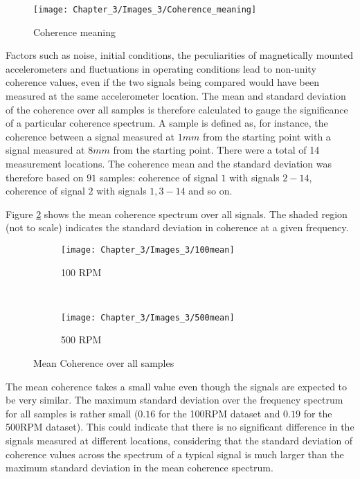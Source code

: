 \begin{figure}[H]
	\centering
	\texttt{[image: Chapter\_3/Images\_3/Coherence\_meaning]}
	\caption{Coherence meaning}
	\label{F:Coherence_meaning}
\end{figure}

Factors such as noise, initial conditions, the peculiarities of magnetically mounted accelerometers and fluctuations in operating conditions lead to non-unity coherence values, even if the two signals being compared would have been measured at the same accelerometer location. The mean and standard deviation of the coherence over all samples is therefore calculated to gauge the significance of a particular coherence spectrum. A sample is defined as, for instance, the coherence between a signal measured at $1mm$ from the starting point with a signal measured at $8mm$ from the starting point. There were a total of 14 measurement locations. The coherence mean and the standard deviation was therefore based on $91$ samples: coherence of signal $1$ with signals $2-14$, coherence of signal $2$ with signals $1, 3-14$ and so on. 

Figure \ref{F:mean} shows the mean coherence spectrum over all signals. The shaded region (not to scale) indicates the standard deviation in coherence at a given frequency.  

\begin{figure}[H]
	\centering
	\begin{subfigure}{0.49\textwidth}
		\texttt{[image: Chapter\_3/Images\_3/100mean]}
		\caption{100 RPM}
	\end{subfigure}
	~
	\begin{subfigure}{0.49\textwidth}
		\texttt{[image: Chapter\_3/Images\_3/500mean]}
		\caption{500 RPM}
	\end{subfigure}
	
	\caption{Mean Coherence over all samples}
	\label{F:mean}
\end{figure}

The mean coherence takes a small value even though the signals are expected to be very similar. The maximum standard deviation over the frequency spectrum for all samples is rather small ($0.16$ for the 100RPM dataset and $0.19$ for the 500RPM dataset). This could indicate that there is no significant difference in the signals measured at different locations, considering that the standard deviation of coherence values across the spectrum of a typical signal is much larger than the maximum standard deviation in the mean coherence spectrum. 

